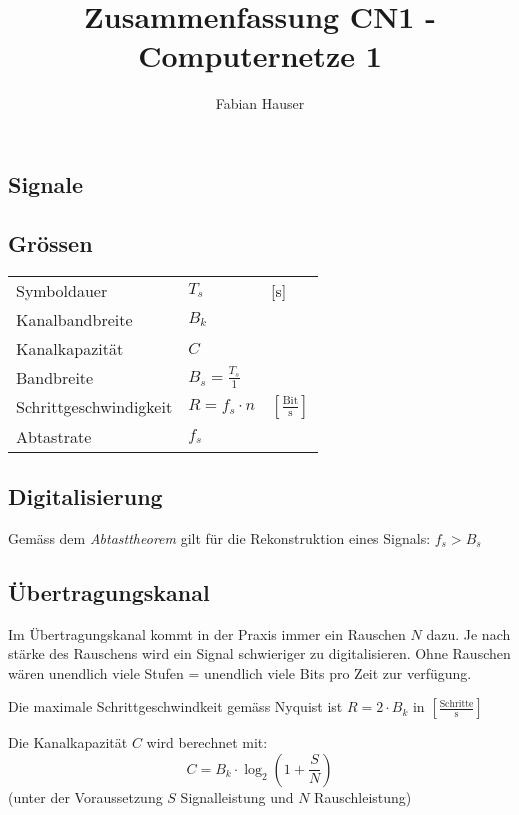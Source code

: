 

\title{Zusammenfassung CN1 - Computernetze 1}
\author{Fabian Hauser}
 

\maketitle
\begin{multicols}{2}
\section{Signale}

\subsection{Grössen}
	\begin{tabular} {l l l}
		Symboldauer & $T_s$ & [s] \\
		Kanalbandbreite & $B_k$ \\
		Kanalkapazität & $C$ \\
		Bandbreite & $B_s = \frac{T_s}{1}$ \\
		Schrittgeschwindigkeit & $R = f_s \cdot n$ & $\left[\frac{\text{Bit}}{\text{s}}\right]$\\ %
		Abtastrate & $f_s$
	\end{tabular}

\subsection{Digitalisierung}
	Gemäss dem \emph{Abtasttheorem} gilt für die Rekonstruktion eines Signals: $f_s > B_s$

\subsection{Übertragungskanal}
	
	Im Übertragungskanal kommt in der Praxis immer ein Rauschen $N$ dazu. Je nach stärke des Rauschens wird ein Signal schwieriger zu digitalisieren. Ohne Rauschen wären unendlich viele Stufen = unendlich viele Bits pro Zeit zur verfügung.
	
	Die maximale Schrittgeschwindkeit gemäss Nyquist ist $R=2 \cdot B_k$ in $\left[\frac{\text{Schritte}}{\text{s}}\right]$
	
	Die Kanalkapazität $C$ wird berechnet mit:
	\[
		C = B_k \cdot \log_2{(1 + \frac{S}{N})}
	\]
	(unter der Voraussetzung $S$ Signalleistung und $N$ Rauschleistung)
	

\end{multicols}
